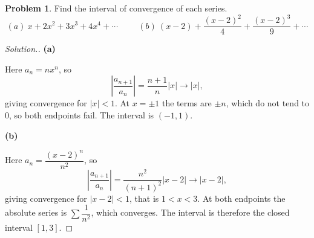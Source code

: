 \documentclass[11pt,a4paper]{article}
\theoremstyle{definition}
\newtheorem{problemx}{Problem}[subsection]
\newenvironment{problem}{\begin{problemx}}{\end{problemx}}
\newenvironment{solution}
  {\renewcommand{\qedsymbol}{}\begin{proof}[\textit{Solution}.]}
  {\end{proof}}
\newcommand{\subhead}[1]{%
  \par\medskip\noindent\textbf{#1}\par\nobreak\smallskip}
\begin{document}
\begin{problem}
Find the interval of convergence of each series.
$$(a)\ x + 2x^2 + 3x^3 + 4x^4 + \cdots\hspace{1cm}
(b)\ (x-2) + \frac{(x-2)^2}{4} + \frac{(x-2)^3}{9} + \cdots$$
\end{problem}
\begin{solution}
\subhead{(a)}
Here $a_n = nx^n$, so
$$\left|\frac{a_{n+1}}{a_n}\right| = \frac{n+1}{n}\left|x\right|
\longrightarrow \left|x\right| ,$$
giving convergence for $\left|x\right|<1$. At $x = \pm 1$ the terms are $\pm n$,
which do not tend to $0$, so both endpoints fail. The interval is
$(-1, 1)$.

\subhead{(b)}
Here $a_n = \dfrac{(x-2)^n}{n^2}$, so
$$\left|\frac{a_{n+1}}{a_n}\right| = \frac{n^2}{(n+1)^2}\left|x-2\right|
\longrightarrow \left|x-2\right| ,$$
giving convergence for $\left|x-2\right|<1$, that is $1<x<3$. At both endpoints
the absolute series is $\sum\dfrac{1}{n^2}$, which converges. The interval is
therefore the closed interval $[1,3]$.
\end{solution}
\end{document}
